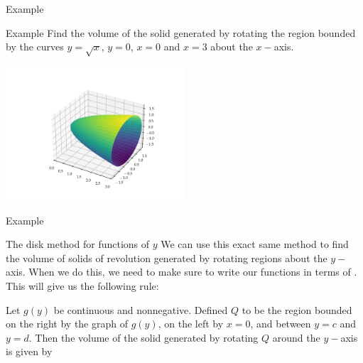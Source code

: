 \documentclass[presentation]{beamer}
\begin{document}
\begin{frame}[label={sec:org2c0d402}]{Example}
\end{frame}

\begin{frame}[label={sec:org773fb7f}]{Example}
Find the volume of the solid generated by rotating the region bounded
by the curves \(y = \sqrt{x}\), \(y = 0\), \(x = 0\) and \(x = 3\)
about the \(x-\)axis.

\begin{center}
\includegraphics[width=0.5\textwidth]{../img/day006-ex02.png}
\end{center}
\vspace{10in}
\end{frame}

\begin{frame}[label={sec:org9777828}]{Example}
\end{frame}

\begin{frame}[label={sec:orge838e0f}]{The disk method for functions of \(y\)}
We can use this exact same method to find the volume of solids of
revolution generated by rotating regions about the \(y-\)axis.  
When we do this, we need to make sure to write our functions in terms
of \uline{\hspace*{1in}}.  This will give us the following rule: 

\begin{theorem}
Let \(g \left( y \right)\) be continuous and nonnegative. Defined \(Q\) to be the region bounded on the right by the graph of \(g \left( y
\right)\), on the left by \(x = 0\), and between \(y = c\) and \(y
= d\).  Then the volume of the solid generated by rotating \(Q\)
around the \(y-\)axis is given by
\[
\, \]
\phantom{butts}
\end{theorem}
\end{frame}
\end{document}
